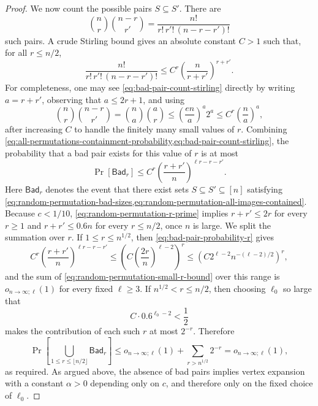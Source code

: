 \begin{proof}
	We now count the possible pairs \(S\subseteq S'\). There are
	\begin{equation}
		\label{eq:bad-pair-count-exact}
		\binom{n}{r}\binom{n-r}{r'}
		=
		\frac{n!}{r!\,r'!\,(n-r-r')!}
	\end{equation}
	such pairs. A crude Stirling bound gives an absolute constant \(C>1\) such that, for all \(r\leq n/2\),
	\begin{equation}
		\label{eq:bad-pair-count-stirling}
		\frac{n!}{r!\,r'!\,(n-r-r')!}
		\leq
		C^r\left(\frac{n}{r+r'}\right)^{r+r'}.
	\end{equation}
	For completeness, one may see \cref{eq:bad-pair-count-stirling} directly by writing \(a=r+r'\), observing that \(a\leq 2r+1\), and using
	\begin{equation}
		\label{eq:bad-pair-count-stirling-derivation}
		\binom{n}{r}\binom{n-r}{r'}
		=\binom{n}{a}\binom{a}{r}
		\leq \left(\frac{en}{a}\right)^a2^a
		\leq C^r\left(\frac{n}{a}\right)^a,
	\end{equation}
	after increasing \(C\) to handle the finitely many small values of \(r\).
	Combining \cref{eq:all-permutations-containment-probability,eq:bad-pair-count-stirling}, the probability that a bad pair exists for this value of \(r\) is at most
	\begin{equation}
		\label{eq:bad-pair-probability-r}
		\Pr[\mathsf{Bad}_r]\leq
		C^r
		\left(\frac{r+r'}{n}\right)^{\ell r-r-r'}.
	\end{equation}
	Here \(\mathsf{Bad}_r\) denotes the event that there exist sets \(S\subseteq S'\subseteq[n]\) satisfying \cref{eq:random-permutation-bad-sizes,eq:random-permutation-all-images-contained}.
	Because \(c<1/10\), \cref{eq:random-permutation-r-prime} implies \(r+r'\leq 2r\) for every \(r\geq 1\) and \(r+r'\leq 0.6n\) for every \(r\leq n/2\), once \(n\) is large. We split the summation over \(r\). If \(1\leq r\leq n^{1/2}\), then \cref{eq:bad-pair-probability-r} gives
	\begin{equation}
		\label{eq:random-permutation-small-r-bound}
		C^r
		\left(\frac{r+r'}{n}\right)^{\ell r-r-r'}
		\leq
		\left(C\left(\frac{2r}{n}\right)^{\ell-2}\right)^r
		\leq
		\left(C2^{\ell-2}n^{-(\ell-2)/2}\right)^r,
	\end{equation}
	and the sum of \cref{eq:random-permutation-small-r-bound} over this range is \(o_{n\to\infty;\ell}(1)\) for every fixed \(\ell\geq 3\). If \(n^{1/2}<r\leq n/2\), then choosing \(\ell_0\) so large that
	\begin{equation}
		\label{eq:random-permutation-degree-choice}
		C\cdot 0.6^{\ell_0-2}<\frac{1}{2}
	\end{equation}
	makes the contribution of each such \(r\) at most \(2^{-r}\). Therefore
	\begin{equation}
		\label{eq:random-permutation-union-bound}
		\Pr\left[\bigcup_{1\leq r\leq \lfloor n/2\rfloor}\mathsf{Bad}_r\right]
		\leq
		o_{n\to\infty;\ell}(1)+\sum_{r>n^{1/2}}2^{-r}
		=o_{n\to\infty;\ell}(1),
	\end{equation}
	as required. As argued above, the absence of bad pairs implies vertex expansion with a constant \(\alpha>0\) depending only on \(c\), and therefore only on the fixed choice of \(\ell_0\).
\end{proof}

